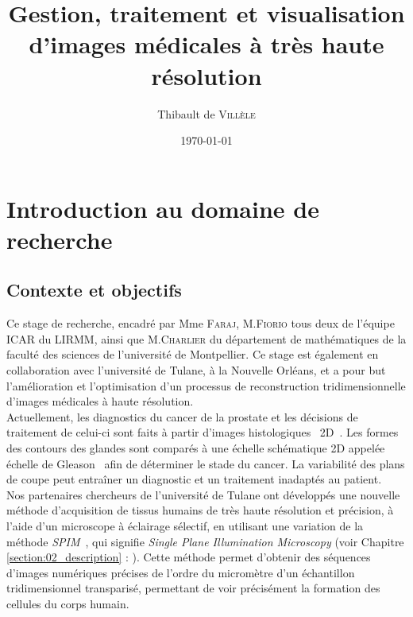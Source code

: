 \documentclass[utf8]{stageM2R}
\author{Thibault de \textsc{Villèle}}
\title{Gestion, traitement et visualisation d'images médicales à très haute résolution}
\date{\today}
\begin{document}
	\frontmatter \maketitle
	\cleardoublepage
	\tableofcontents \mainmatter

	\chapter{Introduction au domaine de recherche}\label{section:01_intro}
	{
		\section{Contexte et objectifs}\label{section:01_01_contexte}
		{
			Ce stage de recherche, encadré par Mme \textsc{Faraj}, M.\textsc{Fiorio} tous deux de l'équipe ICAR du LIRMM, ainsi que M.\textsc{Charlier} du département de mathématiques de la faculté des sciences de l'université de Montpellier. Ce stage est également en collaboration avec l'université de Tulane, à la Nouvelle Orléans, et a pour but l'amélioration et l'optimisation d'un processus de reconstruction tridimensionnelle d'images médicales à haute résolution.\\

			Actuellement, les diagnostics du cancer de la prostate et les décisions de traitement de celui-ci sont faits à partir d'images histologiques\footnotemark~ 2D~\cite{brown2017gleason_diagnosis}. Les formes des contours des glandes sont comparés à une échelle schématique 2D appelée échelle de Gleason~\cite{citation_gleason_score} afin de déterminer le stade du cancer. La variabilité des plans de coupe peut entraîner un diagnostic et un traitement inadaptés au patient.
			\\

			Nos partenaires chercheurs de l'université de Tulane ont développés une nouvelle méthode d'acquisition de tissus humains de très haute résolution et précision, à l'aide d'un microscope à éclairage sélectif, en utilisant une variation de la méthode \textit{SPIM}~\cite{Huisken1007}, qui signifie \textit{Single Plane Illumination Microscopy} (voir Chapitre \ref{section:02_description} : ). Cette méthode permet d'obtenir des séquences d'images numériques précises de l'ordre du micromètre d'un échantillon tridimensionnel transparisé, permettant de voir précisément la formation des cellules du corps humain.\\

}}
\end{document}
